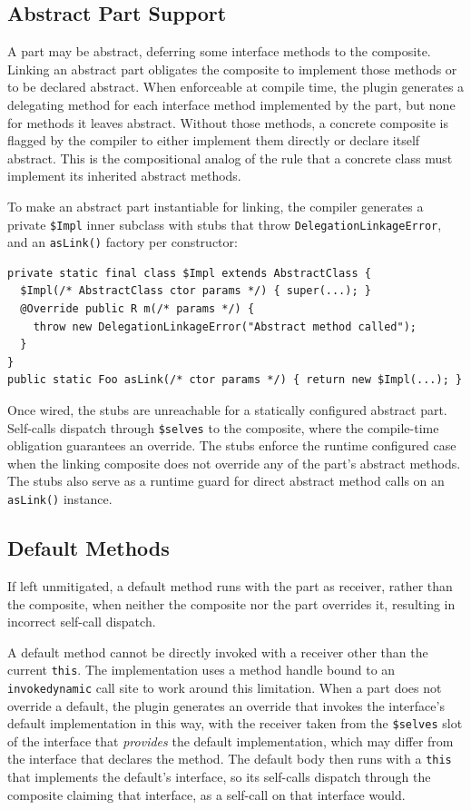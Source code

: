 \documentclass[acmsmall,nonacm]{acmart}
\theoremstyle{acmplain}
\newcommand{\code}[1]{\texttt{#1}}
\begin{document}
\subsection{Abstract Part Support}

A part may be abstract, deferring some interface methods to the composite. Linking an abstract part obligates the composite
to implement those methods or to be declared abstract. When enforceable at compile time, the plugin generates a delegating
method for each interface method implemented by the part, but none for methods it leaves abstract. Without those methods, a
concrete composite is flagged by the compiler to either implement them directly or declare itself abstract. This is the
compositional analog of the rule that a concrete class must implement its inherited abstract methods.

To make an abstract part instantiable for linking, the compiler generates a private \code{\$Impl} inner subclass with stubs
that throw \code{DelegationLinkageError}, and an \code{asLink()} factory per constructor:

\begin{lstlisting}
private static final class $Impl extends AbstractClass {
  $Impl(/* AbstractClass ctor params */) { super(...); }
  @Override public R m(/* params */) {
    throw new DelegationLinkageError("Abstract method called");
  }
}
public static Foo asLink(/* ctor params */) { return new $Impl(...); }
\end{lstlisting}

Once wired, the stubs are unreachable for a statically configured abstract part. Self-calls dispatch through \code{\$selves}
to the composite, where the compile-time obligation guarantees an override. The stubs enforce the runtime configured case
when the linking composite does not override any of the part's abstract methods. The stubs also serve as a runtime guard
for direct abstract method calls on an \code{asLink()} instance.

\subsection{Default Methods}
\label{subsec:default}

If left unmitigated, a default method runs with the part as receiver, rather than the composite, when neither the composite
nor the part overrides it, resulting in incorrect self-call dispatch.

A default method cannot be directly invoked with a receiver other than the current \code{this}. The implementation uses a method handle
bound to an \code{invokedynamic} call site to work around this limitation. When a part does not override a default, the plugin
generates an override that invokes the interface's default implementation in this way, with the receiver taken from the
\code{\$selves} slot of the interface that \emph{provides} the default implementation, which may differ from the interface
that declares the method. The default body then runs with a \code{this} that implements the default's interface, so its
self-calls dispatch through the composite claiming that interface, as a self-call on that interface would.
\end{document}

